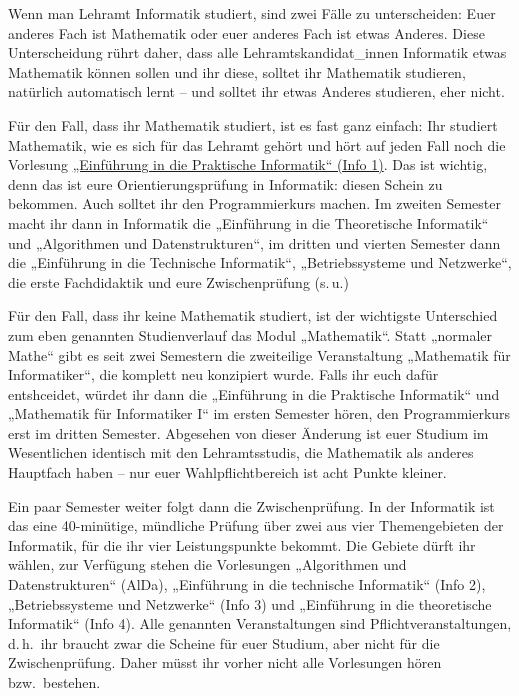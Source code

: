 Wenn man  Lehramt Informatik studiert, sind zwei Fälle zu unterscheiden: Euer anderes
Fach ist Mathematik oder euer anderes Fach ist etwas Anderes. Diese
Unterscheidung rührt daher, dass alle Lehramtskandidat\_innen
Informatik etwas Mathematik können sollen und ihr diese, solltet ihr
Mathematik studieren, natürlich automatisch lernt -- und solltet ihr
etwas Anderes studieren, eher nicht.

Für den Fall, dass ihr Mathematik studiert, ist es fast ganz einfach:
Ihr studiert Mathematik, wie es sich für das Lehramt gehört und hört auf
jeden Fall noch die Vorlesung \hyperref[info1]{„Einführung in die
  Praktische Informatik“ (Info 1)}. Das ist wichtig, denn das ist eure
Orientierungsprüfung in Informatik: diesen Schein zu bekommen. Auch
solltet ihr den Programmierkurs machen. Im zweiten Semester macht ihr
dann in Informatik die „Einführung in die Theoretische Informatik“ und
„Algorithmen und Datenstrukturen“, im dritten und vierten Semester dann die
„Einführung in die Technische Informatik“, „Betriebssysteme und
Netzwerke“, die erste Fachdidaktik und eure Zwischenprüfung (s.\,u.)

Für den Fall, dass ihr keine Mathematik studiert, ist der wichtigste
Unterschied zum eben genannten Studienverlauf das Modul
„Mathematik“. Statt „normaler Mathe“ gibt es seit zwei Semestern die zweiteilige Veranstaltung „Mathematik für
Informatiker“, die komplett neu konzipiert wurde. Falls ihr euch dafür entshceidet, würdet ihr dann die
„Einführung in die Praktische Informatik“ und „Mathematik für Informatiker I“ im ersten Semester
hören, den Programmierkurs erst im dritten Semester. Abgesehen von
dieser Änderung ist euer Studium im Wesentlichen identisch mit den
Lehramtsstudis, die Mathematik als anderes Hauptfach haben -- nur euer
Wahlpflichtbereich ist acht Punkte kleiner.

Ein paar Semester weiter folgt dann die Zwischenprüfung. In der
Informatik ist das eine 40-minütige, mündliche Prüfung über zwei aus
vier Themengebieten der Informatik, für die ihr vier Leistungspunkte
bekommt. Die Gebiete dürft ihr wählen, zur Verfügung stehen die
Vorlesungen „Algorithmen und Datenstrukturen“ (AlDa), „Einführung in
die technische Informatik“ (Info 2), „Betriebssysteme und Netzwerke“
(Info 3) und „Einführung in die theoretische Informatik“ (Info
4). Alle genannten Veranstaltungen sind Pflichtveranstaltungen,
d.\,h.\ ihr braucht zwar die Scheine für euer Studium, aber nicht für
die Zwischenprüfung. Daher müsst ihr vorher nicht alle Vorlesungen
hören bzw.\ bestehen.


